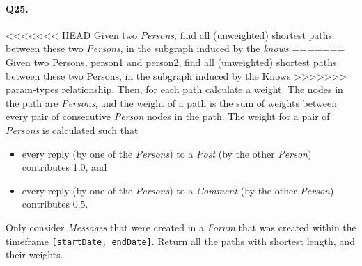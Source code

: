 \paragraph{Q25.}
<<<<<<< HEAD
Given two \emph{Persons}, find all (unweighted) shortest paths between
these two \emph{Persons}, in the subgraph induced by the \emph{knows}
=======
Given two Persons, person1 and person2, find all (unweighted) shortest
paths between these two Persons, in the subgraph induced by the Knows
>>>>>>> param-types
relationship.
Then, for each path calculate a weight. The nodes in the path are
\emph{Persons}, and the weight of a path is the sum of weights between
every pair of consecutive \emph{Person} nodes in the path.
The weight for a pair of \emph{Persons} is calculated such that
\begin{itemize}
\tightlist
\item
  every reply (by one of the \emph{Persons}) to a \emph{Post} (by the
  other \emph{Person}) contributes 1.0, and
\item
  every reply (by one of the \emph{Persons}) to a \emph{Comment} (by the
  other \emph{Person}) contributes 0.5.
\end{itemize}
Only consider \emph{Messages} that were created in a \emph{Forum} that
was created within the timeframe \texttt{{[}startDate,\ endDate{]}}.
Return all the paths with shortest length, and their weights.
